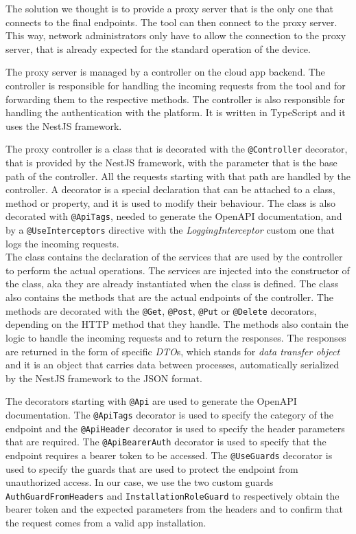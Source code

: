 The solution we thought is to provide a proxy server that is the only one that connects to the final endpoints. The tool can then connect to the proxy server. This way, network administrators only have to allow the connection to the proxy server, that is already expected for the standard operation of the device.

The proxy server is managed by a controller on the cloud app backend. The controller is responsible for handling the incoming requests from the tool and for forwarding them to the respective methods. The controller is also responsible for handling the authentication with the platform. It is written in TypeScript and it uses the NestJS framework.

The proxy controller is a class that is decorated with the \texttt{@Controller} decorator, that is provided by the NestJS framework, with the parameter that is the base path of the controller. All the requests starting with that path are handled by the controller. A decorator is a special declaration that can be attached to a class, method or property, and it is used to modify their behaviour. The class is also decorated with \texttt{@ApiTags}, needed to generate the OpenAPI documentation, and by a \texttt{@UseInterceptors} directive with the \textit{LoggingInterceptor} custom one that logs the incoming requests. \\
The class contains the declaration of the services that are used by the controller to perform the actual operations. The services are injected into the constructor of the class, aka they are already instantiated when the class is defined. The class also contains the methods that are the actual endpoints of the controller. The methods are decorated with the \texttt{@Get}, \texttt{@Post}, \texttt{@Put} or \texttt{@Delete} decorators, depending on the HTTP method that they handle. The methods also contain the logic to handle the incoming requests and to return the responses. The responses are returned in the form of specific \textit{DTO}s, which stands for \textit{data transfer object} and it is an object that carries data between processes, automatically serialized by the NestJS framework to the JSON format.

The decorators starting with \texttt{@Api} are used to generate the OpenAPI documentation. The \texttt{@ApiTags} decorator is used to specify the category of the endpoint and the \texttt{@ApiHeader} decorator is used to specify the header parameters that are required. The \texttt{@ApiBearerAuth} decorator is used to specify that the endpoint requires a bearer token to be accessed. The \texttt{@UseGuards} decorator is used to specify the guards that are used to protect the endpoint from unauthorized access. In our case, we use the two custom guards \texttt{AuthGuardFromHeaders} and \texttt{InstallationRoleGuard} to respectively obtain the bearer token and the expected parameters from the headers and to confirm that the request comes from a valid app installation.

